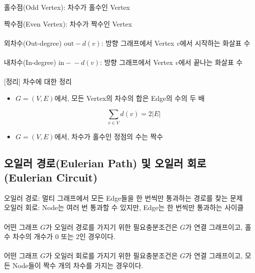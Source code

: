 홀수점(Odd Vertex): 차수가 홀수인 Vertex

짝수점(Even Vertex): 차수가 짝수인 Vertex
\\\\
외차수(Out-degree) $\mathrm{out-}d(v)$: 방향 그래프에서 Vertex $v$에서 시작하는 화살표 수
\\\\
내차수(In-degree) $\mathrm{in-}-d(v)$: 방향 그래프에서 Vertex $v$에서 끝나는 화살표 수
\\\\\phantom{}
[정리] 차수에 대한 정리
\begin{itemize}
    \item $G = (V, E)$에서, 모든 Vertex의 차수의 합은 Edge의 수의 두 배
    
    $$\sum_{v \in V} d(v) = 2|E|$$
    \item $G = (V, E)$에서, 차수가 홀수인 정점의 수는 짝수
\end{itemize}

\newpage
\subsection{오일러 경로(Eulerian Path) 및 오일러 회로(Eulerian Circuit)}
오일러 경로: 멀티 그래프에서 모든 Edge들을 한 번씩만 통과하는 경로를 찾는 문제\\
오일러 회로: Node는 여러 번 통과할 수 있지만, Edge는 한 번씩만 통과하는 사이클\\\\
어떤 그래프 $G$가 오일러 경로를 가지기 위한 필요충분조건은 $G$가 연결 그래프이고, 홀수 차수의 개수가 $0$ 또는 $2$인 경우이다.\\\\
어떤 그래프 $G$가 오일러 회로를 가지기 위한 필요충분조건은 $G$가 연결 그래프이고, 모든 Node들이 짝수 개의 차수를 가지는 경우이다.

